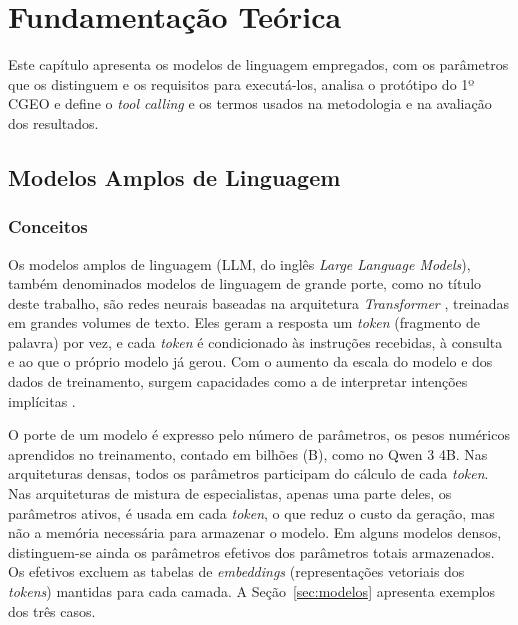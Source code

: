 \chapter{Fundamentação Teórica}
\label{cap:fundamentacao}

Este capítulo apresenta os modelos de linguagem empregados, com os parâmetros que os distinguem e os requisitos para executá-los, analisa o protótipo do 1º CGEO e define o \textit{tool calling} e os termos usados na metodologia e na avaliação dos resultados.

\section{Modelos Amplos de Linguagem}
\label{sec:llm}

\subsection{Conceitos}
\label{sec:llm-conceitos}

Os modelos amplos de linguagem (LLM, do inglês \textit{Large Language Models}), também denominados modelos de linguagem de grande porte, como no título deste trabalho, são redes neurais baseadas na arquitetura \textit{Transformer} \cite{vaswani2017attention}, treinadas em grandes volumes de texto. Eles geram a resposta um \textit{token} (fragmento de palavra) por vez, e cada \textit{token} é condicionado às instruções recebidas, à consulta e ao que o próprio modelo já gerou. Com o aumento da escala do modelo e dos dados de treinamento, surgem capacidades como a de interpretar intenções implícitas \cite{brown2020gpt3, wei2022emergent}.

O porte de um modelo é expresso pelo número de parâmetros, os pesos numéricos aprendidos no treinamento, contado em bilhões (B), como no Qwen 3 4B. Nas arquiteturas densas, todos os parâmetros participam do cálculo de cada \textit{token}. Nas arquiteturas de mistura de especialistas, apenas uma parte deles, os parâmetros ativos, é usada em cada \textit{token}, o que reduz o custo da geração, mas não a memória necessária para armazenar o modelo. Em alguns modelos densos, distinguem-se ainda os parâmetros efetivos dos parâmetros totais armazenados. Os efetivos excluem as tabelas de \textit{embeddings} (representações vetoriais dos \textit{tokens}) mantidas para cada camada. A Seção~\ref{sec:modelos} apresenta exemplos dos três casos.

